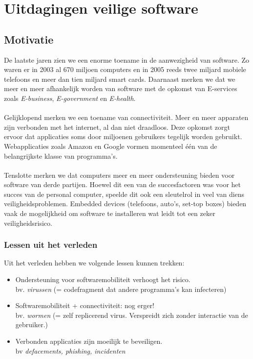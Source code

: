 \documentclass[../main.tex]{subfiles}
\begin{document}
\chapter{Uitdagingen veilige software}

\section{Motivatie}
De laatste jaren zien we een enorme toename in de aanwezigheid van software. Zo waren er in 2003 al 670 miljoen computers en in 2005 reeds twee miljard mobiele telefoons en meer dan tien miljard smart cards. Daarnaast merken we dat we meer en meer afhankelijk worden van software met de opkomst van E-services zoals \textit{E-business}, \textit{E-government} en \textit{E-health}. 
\\\\
Gelijklopend merken we een toename van connectiviteit. Meer en meer apparaten zijn verbonden met het internet, al dan niet draadloos. Deze opkomst zorgt ervoor dat applicaties soms door miljoenen gebruikers tegelijk worden gebruikt. Webapplicaties zoals Amazon en Google vormen momenteel \'e\'en van de belangrijkste klasse van programma's.
\\\\
Tenslotte merken we dat computers meer en meer ondersteuning bieden voor software van derde partijen. Hoewel dit een van de succesfactoren was voor het succes van de personal computer, speelde dit ook een sleutelrol in veel van diens veiligheidsproblemen. Embedded devices (telefoons, auto's, set-top boxes) bieden vaak de mogelijkheid om software te installeren wat leidt tot een zeker veiligheidsrisico.

\subsection{Lessen uit het verleden}
Uit het verleden hebben we volgende lessen kunnen trekken:
\begin{itemize}
	\item Ondersteuning voor softwaremobiliteit verhoogt het risico. \\ bv. \textit{virussen} (= codefragment dat andere programma's kan infecteren)
	\item Softwaremobiliteit + connectiviteit: nog erger! \\ bv. \textit{wormen} (= zelf replicerend virus. Verspreidt zich zonder interactie van de gebruiker.)
	\item Verbonden applicaties zijn moeilijk te beveiligen. \\ bv \textit{defacements, phishing, incidenten}
\end{itemize}
\end{document}
